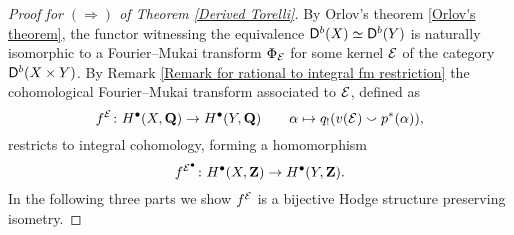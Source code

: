 
\begin{proof}[Proof for $(\Rightarrow)$ of Theorem \ref{Derived Torelli}]
    By Orlov's theorem \ref{Orlov's theorem}, the functor witnessing the equi\-valence $\mathsf{D}^b(X) \simeq \mathsf{D}^b(Y)$ is naturally isomorphic to a Fourier--Mukai transform $\Phi_{\mathcal E}$ for some kernel $\mathcal E$ of the category $\mathsf{D}^b(X \times Y)$. 
    By Remark \ref{Remark for rational to integral fm restriction} the cohomological Fourier--Mukai transform associated to $\mathcal E$, defined as
     \[
        f^{\mathcal E} \colon H^\bullet(X, \mathbf Q) \to H^\bullet(Y, \mathbf Q) \qquad \alpha \mapsto q_!(v(\mathcal E) \smallsmile p^*(\alpha)),
    \]
    restricts to integral cohomology, forming a homomorphism
    \[
        f^{\mathcal E^\bullet} \colon H^\bullet(X, \mathbf Z) \to H^\bullet(Y, \mathbf Z).
    \]
    In the following three parts we show $f^{\mathcal E}$ is a bijective Hodge structure preserving isometry.
    

\end{proof}
